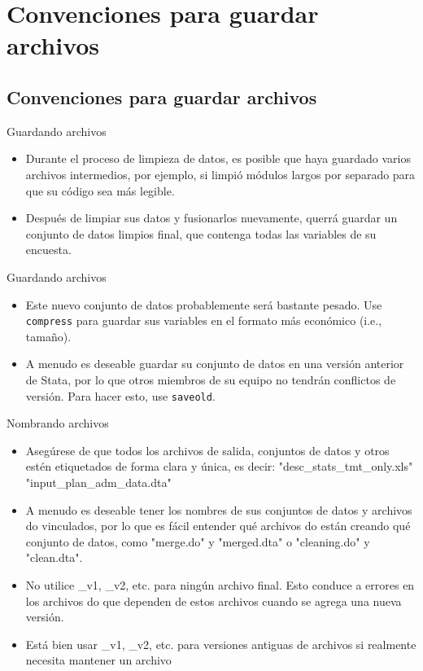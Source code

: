 \documentclass[10pt, aspectratio=169, compress]{beamer}
\makeatletter
\def\beamer@writeslidentry@miniframesoff{%
	\expandafter\beamer@ifempty\expandafter{\beamer@framestartpage}{}%
	{%
		\clearpage\beamer@notesactions%
	}
}
\newcommand*{\miniframesoff}{\let\beamer@writeslidentry=\beamer@writeslidentry@miniframesoff}
\makeatother
\begin{document}
\section{Convenciones para guardar archivos}
\subsection{Convenciones para guardar archivos}
\begin{frame}[t]{Guardando archivos}
	\begin{itemize}
		\item Durante el proceso de limpieza de datos, es posible que haya guardado varios archivos intermedios, por ejemplo, si limpió módulos largos por separado para que su código sea más legible.
		\item Después de limpiar sus datos y fusionarlos nuevamente, querrá guardar un conjunto de datos limpios final, que contenga todas las variables de su encuesta.
	\end{itemize}
\end{frame}
\begin{frame}[t]{Guardando archivos}
	\begin{itemize}
		\item Este nuevo conjunto de datos probablemente será bastante pesado. Use \texttt{compress} para guardar sus variables en el formato más económico (i.e., tamaño).
		\item A menudo es deseable guardar su conjunto de datos en una versión anterior de Stata, por lo que otros miembros de su equipo no tendrán conflictos de versión. Para hacer esto, use \texttt{saveold}.
	\end{itemize}
\end{frame}
\begin{frame}[t]{Nombrando archivos}
	\begin{itemize}
		\item Asegúrese de que todos los archivos de salida, conjuntos de datos y otros estén etiquetados de forma clara y única, es decir: "desc\_stats\_tmt\_only.xls" "input\_plan\_adm\_data.dta"
		\item A menudo es deseable tener los nombres de sus conjuntos de datos y archivos do vinculados, por lo que es fácil entender qué archivos do están creando qué conjunto de datos, como "merge.do" y "merged.dta" o "cleaning.do" y "clean.dta".
		\item No utilice \_v1, \_v2, etc. para ningún archivo final. Esto conduce a errores en los archivos do que dependen de estos archivos cuando se agrega una nueva versión.
		\item Está bien usar \_v1, \_v2, etc. para versiones antiguas de archivos si realmente necesita mantener un archivo
	\end{itemize}
\end{frame}
\miniframesoff 	
\end{document}
